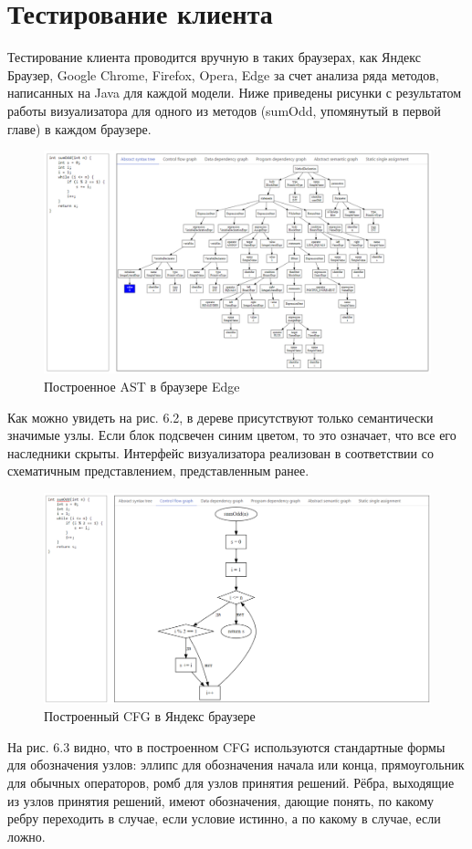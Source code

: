 \section{Тестирование клиента} \label{ch6:sec2}
Тестирование клиента проводится вручную в таких браузерах, как Яндекс Браузер, Google Chrome, Firefox, Opera, Edge за счет анализа ряда методов, написанных на Java для каждой модели. Ниже приведены рисунки с результатом работы визуализатора для одного из методов (sumOdd, упомянутый в первой главе) в каждом браузере.

\begin{figure}[h]
	\center
	\includegraphics [scale=0.5] {my_folder/images/my/21}
	\caption{Построенное AST в браузере Edge}
	\label{fig:21}
\end{figure}

Как можно увидеть на рис. 6.2, в дереве присутствуют только семантически значимые узлы. Если блок подсвечен синим цветом, то это означает, что все его наследники скрыты. Интерфейс визуализатора реализован в соответствии со схематичным представлением, представленным ранее.

\begin{figure}[h]
	\center
	\includegraphics [scale=0.6] {my_folder/images/my/22}
	\caption{Построенный CFG в Яндекс браузере}
	\label{fig:22}
\end{figure}
\newpage
На рис. 6.3 видно, что в построенном CFG используются стандартные формы для обозначения узлов: эллипс для обозначения начала или конца, прямоугольник для обычных операторов, ромб для узлов принятия решений. Рёбра, выходящие из узлов принятия решений, имеют обозначения, дающие понять, по какому ребру переходить в случае, если условие истинно, а по какому в случае, если ложно.

